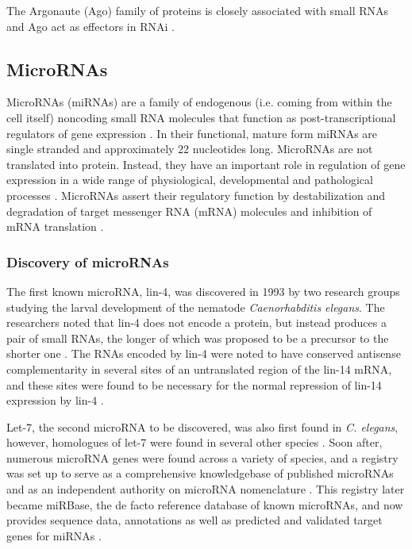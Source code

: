 The Argonaute (Ago) family of proteins is closely associated with small RNAs and
Ago act as effectors in RNAi \cite{Ha2014}.







\subsection{MicroRNAs}\label{micrornas}

MicroRNAs (miRNAs) are a family of endogenous (i.e. coming from within the
cell itself) noncoding small RNA molecules that function as post-transcriptional
regulators of gene expression \citep{Ambros2004}. In their
functional, mature form miRNAs are single stranded and approximately 22
nucleotides long. MicroRNAs are not translated into protein. Instead, they
have an important role in regulation of gene expression in a wide range of
physiological, developmental and pathological processes \citep{Bartel2009}.
MicroRNAs assert their regulatory function by destabilization and degradation
of target messenger RNA (mRNA) molecules and inhibition of mRNA translation
\citep{Fabian2010}.



\subsubsection{Discovery of microRNAs}

The first known microRNA, lin-4, was discovered in 1993 by two research groups
studying the larval development of the nematode \emph{Caenorhabditis elegans}.
The researchers noted that lin-4 does not encode a protein, but instead
produces a pair of small RNAs, the longer of which was proposed to be a
precursor to the shorter one \citep{Lee1993}. The RNAs encoded by lin-4 were
noted to have conserved antisense complementarity in several sites of an
untranslated region of the lin-14 mRNA, and these sites were found to be
necessary for the normal repression of lin-14 expression by lin-4
\citep{Lee1993,Wightman1993}.

Let-7, the second microRNA to be discovered, was also first found in \emph{C.
elegans}, however, homologues of let-7 were found in several other species
\citep{Pasquinelli2000}. Soon after, numerous microRNA genes were found across
a variety of species, and a registry was set up to serve as a comprehensive
knowledgebase of published microRNAs and as an independent authority on
microRNA nomenclature \citep{GriffithsJones2004}. This registry later became
miRBase, the de facto reference database of known microRNAs, and now provides
sequence data, annotations as well as predicted and validated target genes for
miRNAs \citep{Kozomara2014}.

